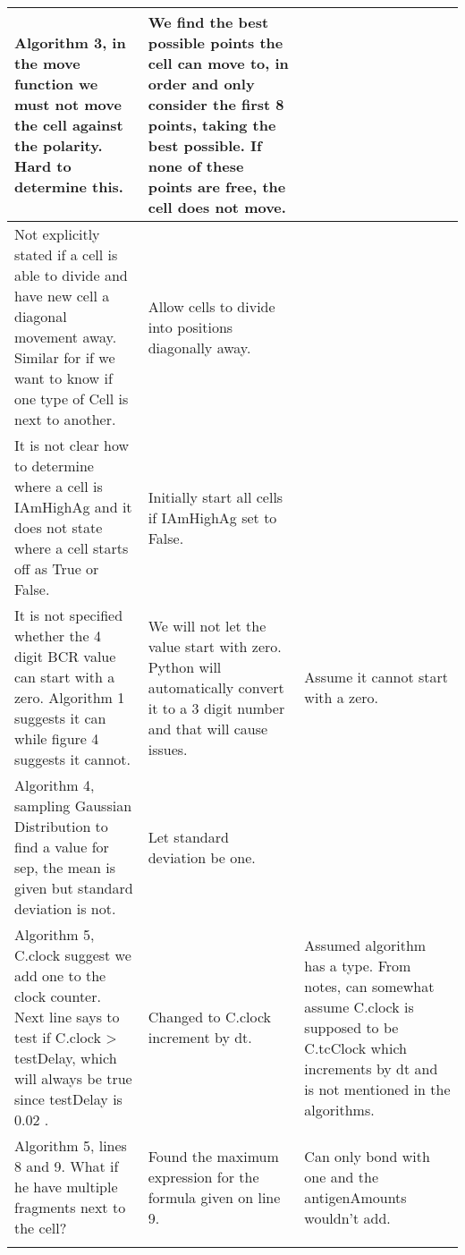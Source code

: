 \documentclass[english]{article}
\begin{document}
\begin{center}
\begin{longtable}{|>{\centering}p{2.1in}|>{\centering}p{2.1in}|>{\centering}p{2.1in}|}
Algorithm 3, in the move function we must not move the cell against the polarity. Hard to determine this. & We find the best possible points the cell can move to, in order and only consider the first 8 points, taking the best possible. If none of these points are free, the cell does not move.& 
\tabularnewline
\hline 

Not explicitly stated if a cell is able to divide and have new cell a diagonal movement away. Similar for if we want to know if one type of Cell is next to another. & Allow cells to divide into positions diagonally away.  & 
\tabularnewline
\hline

It is not clear how to determine where a cell is IAmHighAg and it does not state where a cell starts off as True or False. & Initially start all cells if IAmHighAg set to False. &
\tabularnewline
\hline

It is not specified whether the 4 digit BCR value can start with a zero. Algorithm 1 suggests it can while figure 4 suggests it cannot. & We will not let the value start with zero. Python will automatically convert it to a 3 digit number and that will cause issues.  & Assume it cannot start with a zero. 
\tabularnewline
\hline

Algorithm 4, sampling Gaussian Distribution to find a value for sep, the mean is given but standard deviation is not. & Let standard deviation be one. &
\tabularnewline
\hline

Algorithm 5, C.clock suggest we add one to the clock counter. Next line says to test if C.clock > testDelay, which will always be true since testDelay is 0.02 . & Changed to C.clock increment by dt. & Assumed algorithm has a type. From notes, can somewhat assume C.clock is supposed to be C.tcClock which increments by dt and is not mentioned in the algorithms. 
\tabularnewline
\hline

Algorithm 5, lines 8 and 9. What if he have multiple fragments next to the cell? & Found the maximum expression for the formula given on line 9. & Can only bond with one and the antigenAmounts wouldn't add.
\tabularnewline
\hline



\tabularnewline
\hline


\end{longtable}
\par\end{center}
\end{document}
